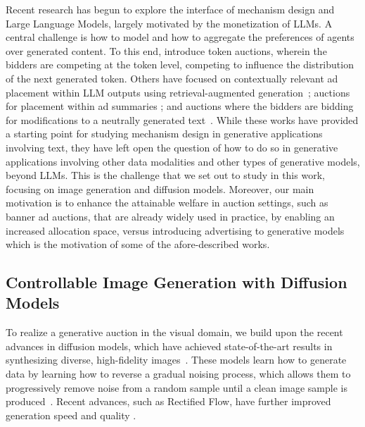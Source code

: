 \documentclass[format=acmsmall, review=false]{acmart}
\begin{document}
Recent research has begun to explore the interface of mechanism design and Large Language Models, largely motivated by the monetization of LLMs. A central challenge is how to model and how to aggregate the preferences of agents over generated content. To this end, \citet{duetting2024mechanismdesignlargelanguage} introduce token auctions, wherein the bidders are competing at the token level, competing to influence the distribution of the next generated token. Others have focused on contextually relevant ad placement within LLM outputs using retrieval-augmented generation~\citep{hajiaghayi2024adauctionsllmsretrieval}; auctions for placement within ad summaries \citep{dubey2024auctionsllmsummaries}; and auctions where the bidders are bidding for modifications to a neutrally generated text~\citep{feizi2024onlineadvertisementsllmsopportunities}. While these works have provided a starting point for studying mechanism design in generative applications involving text, they have left open the question of how to do so in generative applications involving other data modalities and other types of generative models, beyond LLMs. This is the challenge that we set out to study in this work, focusing on image generation and diffusion models. Moreover, our main motivation is to enhance the attainable welfare in auction settings, such as banner ad auctions, that are already widely used in practice, by enabling an increased allocation space, versus introducing advertising to generative models which is the motivation of some of the afore-described works. 


\subsection{Controllable Image Generation with Diffusion Models}

To realize a generative auction in the visual domain, we build upon the recent advances in diffusion models, which have achieved state-of-the-art results in synthesizing diverse, high-fidelity images~\citep{ho2020ddpm, song2019generative, rombach2022highresolutionimagesynthesislatent, dhariwal2021diffusionmodelsbeatgans}. These models learn how to generate data by learning how to reverse a gradual noising process, which allows them to progressively remove noise from a random sample until a clean image sample is produced~\citep{sohldickstein2015deepunsupervisedlearningusing, ho2020ddpm, songSohlDickstein2021score}. Recent advances, such as Rectified Flow, have further improved generation speed and quality \citep{liu2022flowstraightfastlearning, esser2024scalingrectifiedflowtransformers}.
\end{document}
